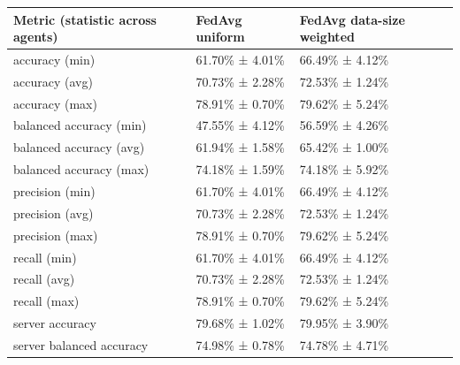 \begin{tabular}{lll}
\hline
 Metric (statistic across agents)   & FedAvg uniform   & FedAvg data-size weighted   \\
\hline
 accuracy (min)                     & 61.70\% ± 4.01\%   & 66.49\% ± 4.12\%              \\
 accuracy (avg)                     & 70.73\% ± 2.28\%   & 72.53\% ± 1.24\%              \\
 accuracy (max)                     & 78.91\% ± 0.70\%   & 79.62\% ± 5.24\%              \\
 balanced accuracy (min)            & 47.55\% ± 4.12\%   & 56.59\% ± 4.26\%              \\
 balanced accuracy (avg)            & 61.94\% ± 1.58\%   & 65.42\% ± 1.00\%              \\
 balanced accuracy (max)            & 74.18\% ± 1.59\%   & 74.18\% ± 5.92\%              \\
 precision (min)                    & 61.70\% ± 4.01\%   & 66.49\% ± 4.12\%              \\
 precision (avg)                    & 70.73\% ± 2.28\%   & 72.53\% ± 1.24\%              \\
 precision (max)                    & 78.91\% ± 0.70\%   & 79.62\% ± 5.24\%              \\
 recall (min)                       & 61.70\% ± 4.01\%   & 66.49\% ± 4.12\%              \\
 recall (avg)                       & 70.73\% ± 2.28\%   & 72.53\% ± 1.24\%              \\
 recall (max)                       & 78.91\% ± 0.70\%   & 79.62\% ± 5.24\%              \\
 server accuracy                    & 79.68\% ± 1.02\%   & 79.95\% ± 3.90\%              \\
 server balanced accuracy           & 74.98\% ± 0.78\%   & 74.78\% ± 4.71\%              \\
\hline
\end{tabular}